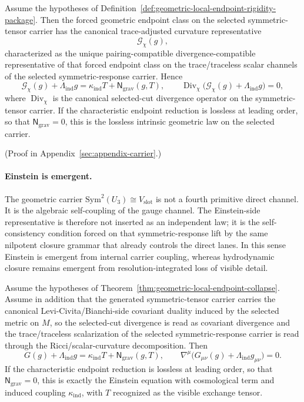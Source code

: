 \begin{theorem}
\label{thm:geometric-local-endpoint-collapse}
Assume the hypotheses of
Definition~\ref{def:geometric-local-endpoint-rigidity-package}. Then the forced
geometric endpoint class on the selected symmetric-tensor carrier has the
canonical trace-adjusted curvature representative
\[
\mathcal G_{\chi}(g),
\]
characterized as the unique pairing-compatible divergence-compatible
representative of that forced endpoint class on the trace/traceless scalar
channels of the selected symmetric-response carrier. Hence
\[
\mathcal G_{\chi}(g)+\Lambda_{\mathrm{ind}}g
=
\kappa_{\mathrm{ind}}T+\mathsf N_{\mathrm{grav}}(g,T),
\qquad
\operatorname{Div}_{\chi}\bigl(\mathcal G_{\chi}(g)+\Lambda_{\mathrm{ind}}g\bigr)=0,
\]
where \(\operatorname{Div}_{\chi}\) is the canonical selected-cut divergence
operator on the symmetric-tensor carrier. If the characteristic endpoint
reduction is lossless at leading order, so that \(\mathsf N_{\mathrm{grav}}=0\),
this is the lossless intrinsic geometric law on the selected carrier.
\end{theorem}

(Proof in Appendix~\ref{sec:appendix-carrier}.)

\paragraph{Einstein is emergent.}
The geometric carrier \(\mathrm{Sym}^2(U_3)\cong V_{\mathrm{slot}}\) is not a fourth
primitive direct channel. It is the algebraic self-coupling of the gauge
channel. The Einstein-side representative is therefore not inserted as an
independent law; it is the self-consistency condition forced on that
symmetric-response lift by the same nilpotent closure grammar that already
controls the direct lanes. In this sense Einstein is emergent from internal
carrier coupling, whereas hydrodynamic closure remains emergent from
resolution-integrated loss of visible detail.

\begin{corollary}
\label{cor:recognizable-einstein-identity}
Assume the hypotheses of
Theorem~\ref{thm:geometric-local-endpoint-collapse}. Assume in addition that
the generated symmetric-tensor carrier carries the canonical
Levi-Civita/Bianchi-side covariant duality induced by the selected metric on
\(M\), so the selected-cut divergence is read as covariant divergence and the
trace/traceless scalarization of the selected symmetric-response carrier is
read through the Ricci/scalar-curvature decomposition.
Then
\[
G(g)+\Lambda_{\mathrm{ind}}g
=
\kappa_{\mathrm{ind}}T+\mathsf N_{\mathrm{grav}}(g,T),
\qquad
\nabla^\mu\bigl(G_{\mu\nu}(g)+\Lambda_{\mathrm{ind}}g_{\mu\nu}\bigr)=0.
\]
If the characteristic endpoint reduction is lossless at leading order, so that
\(\mathsf N_{\mathrm{grav}}=0\), this is exactly the Einstein equation with
cosmological term and induced coupling \(\kappa_{\mathrm{ind}}\), with \(T\)
recognized as the visible exchange tensor.
\end{corollary}

